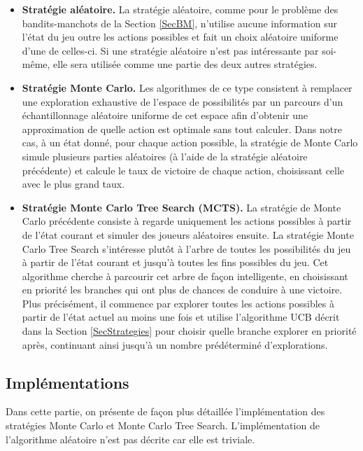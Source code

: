 \documentclass[a4paper,11pt]{article}
\begin{document}
\begin{itemize}[label=\textbullet, leftmargin=*]
\item \textbf{Stratégie aléatoire.} La stratégie aléatoire, comme pour le problème des bandits-manchots de la Section \ref{SecBM}, n'utilise aucune information sur l'état du jeu outre les actions possibles et fait un choix aléatoire uniforme d'une de celles-ci. Si une stratégie aléatoire n'est pas intéressante par soi-même, elle sera utilisée comme une partie des deux autres stratégies.

\item \textbf{Stratégie Monte Carlo.} Les algorithmes de ce type consistent à remplacer une exploration exhaustive de l'espace de possibilités par un parcours d'un échantillonnage aléatoire uniforme de cet espace afin d'obtenir une approximation de quelle action est optimale sans tout calculer. Dans notre cas, à un état donné, pour chaque action possible, la stratégie de Monte Carlo simule plusieurs parties aléatoires (à l'aide de la stratégie aléatoire précédente) et calcule le taux de victoire de chaque action, choisissant celle avec le plus grand taux.

\item \textbf{Stratégie Monte Carlo Tree Search (MCTS).} La stratégie de Monte Carlo précédente consiste à regarde uniquement les actions possibles à partir de l'état courant et simuler des joueurs aléatoires ensuite. La stratégie Monte Carlo Tree Search s'intéresse plutôt à l'arbre de toutes les possibilités du jeu à partir de l'état courant et jusqu'à toutes les fins possibles du jeu. Cet algorithme cherche à parcourir cet arbre de façon intelligente, en choisissant en priorité les branches qui ont plus de chances de conduire à une victoire. Plus précisément, il commence par explorer toutes les actions possibles à partir de l'état actuel au moins une fois et utilise l'algorithme UCB décrit dans la Section \ref{SecStrategies} pour choisir quelle branche explorer en priorité après, continuant ainsi jusqu'à un nombre prédéterminé d'explorations.
\end{itemize}

\subsection{Implémentations}

Dans cette partie, on présente de façon plus détaillée l'implémentation des stratégies Monte Carlo et Monte Carlo Tree Search. L'implémentation de l'algorithme aléatoire n'est pas décrite car elle est triviale.
\end{document}
